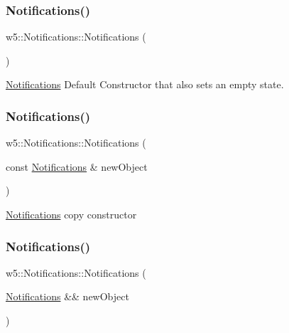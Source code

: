 \subsubsection{\texorpdfstring{Notifications()}{Notifications()}\hspace{0.1cm}{\footnotesize\ttfamily [1/3]}}
{\footnotesize\ttfamily w5\+::\+Notifications\+::\+Notifications (\begin{DoxyParamCaption}{ }\end{DoxyParamCaption})}

\mbox{\hyperlink{classw5_1_1Notifications}{Notifications}} Default Constructor that also sets an empty state. \mbox{\label{classw5_1_1Notifications_a7fbdc734f79281a93523b7c7e8ec3c97}} 
\subsubsection{\texorpdfstring{Notifications()}{Notifications()}\hspace{0.1cm}{\footnotesize\ttfamily [2/3]}}
{\footnotesize\ttfamily w5\+::\+Notifications\+::\+Notifications (\begin{DoxyParamCaption}\item[{const \mbox{\hyperlink{classw5_1_1Notifications}{Notifications}} \&}]{new\+Object }\end{DoxyParamCaption})}

\mbox{\hyperlink{classw5_1_1Notifications}{Notifications}} copy constructor \mbox{\label{classw5_1_1Notifications_aeefa688a71494e3779e2b50f3bd9b5e7}} 
\subsubsection{\texorpdfstring{Notifications()}{Notifications()}\hspace{0.1cm}{\footnotesize\ttfamily [3/3]}}
{\footnotesize\ttfamily w5\+::\+Notifications\+::\+Notifications (\begin{DoxyParamCaption}\item[{\mbox{\hyperlink{classw5_1_1Notifications}{Notifications}} \&\&}]{new\+Object }\end{DoxyParamCaption})}

